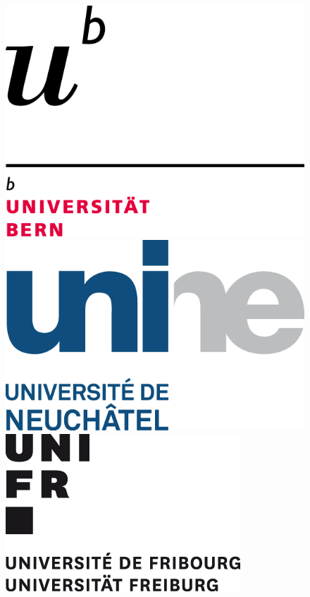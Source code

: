 \documentclass[
11pt, %
english, %
singlespacing, %
headsepline, %
chapterinoneline, %
]{MastersDoctoralThesis} %
\begin{document}
\begin{titlepage}
\begin{center}
\begin{figure}[htp]
    \centering
    \includegraphics[scale=0.30]{Pic/UNI_Bern.png}\hfill
    \includegraphics[scale=0.30]{Pic/UNI_Neuenburg.png}\hfill
    \includegraphics[scale=0.80]{Pic/UNI_Fribourg.png}
  \end{figure}

\end{center}
\end{titlepage}
\end{document}
